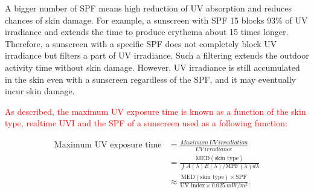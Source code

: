 \documentclass[journal]{IEEEtran}
\begin{document}
A bigger number of SPF means high reduction of UV absorption and reduces chances of skin damage. For example, a sunscreen with SPF 15 blocks 93\% of UV irradiance and extends the time to produce erythema about 15 times longer. Therefore, a sunscreen with a specific SPF does not completely block UV irradiance but filters a part of UV irradiance. Such a filtering extends the outdoor activity time without skin damage. However, UV irradiance is still accumulated in the skin even with a sunscreen regardless of the SPF, and it may eventually incur skin damage.

\textcolor{red}{As described, the maximum UV exposure time is known as a function of the skin type, realtime UVI and the SPF of a sunscreen used as a following function:}
%
%

\begin{equation} \label{eq: max_exp_time}
\begin{split}
\text{Maximum~UV~exposure~time}
&= \frac{Maximum~UV~irradiation}{UV~irradiance} \\
&= \frac{\text{MED}(\text{skin~type})}{\int A(\lambda)E(\lambda)  / \text{MPF}(\lambda) d \lambda} \\
&\approx \frac{\text{MED}(\text{skin~type})\times \text{SPF}}{\text{UV~index} \times 0.025~mW/m^2}.
\end{split}
\end{equation}
\end{document}
